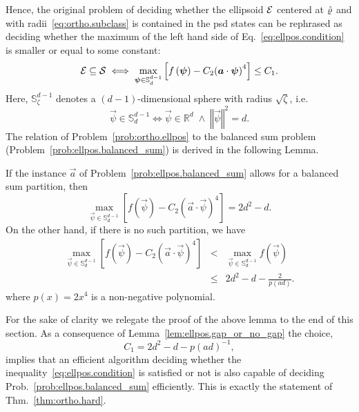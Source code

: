 Hence, the original problem of deciding whether the ellipsoid $\mathcal{E}$ centered at $\hat{\varrho}$ and with radii~\eqref{eq:ortho.subclass} is contained in the psd states can be rephrased as deciding whether the maximum of the left hand side of Eq.~\eqref{eq:ellpos.condition} is smaller or equal to some constant:
\begin{equation}
  \mathcal{E}\subseteq\mathcal{S}
  \iff
  \max_{{\boldsymbol{\psi}}\in\mathbb{S}^{d-1}_{d}}\left[f\left({\boldsymbol{\psi}}\right)-C_{2}{\left({\boldsymbol{a}} \cdot {\boldsymbol{\psi}}\right)}^{4}\right]\leq C_{1}.
  \label{eq:ellpos.max_condition}
\end{equation}
Here, $ \mathbb{S}^{d-1}_{\zeta}$ denotes a $(d-1)$-dimensional sphere with radius $\sqrt\zeta$, i.e.
\begin{equation}
 \vec\psi\in\mathbb{S}^{d-1}_{d} \iff    \vec\psi\in\mathbb{R}^{d}\;\wedge \; \left\Vert \vec\psi\right\Vert^{2}=d.
\end{equation}
The relation of Problem~\ref{prob:ortho.ellpos} to the balanced sum problem (Problem~\ref{prob:ellpos.balanced_sum}) is derived in the following Lemma.
\begin{lemma}\label{lem:ellpos.gap_or_no_gap}
  If the instance $\vec a$ of Problem~\ref{prob:ellpos.balanced_sum} allows for a balanced sum partition, then
  \begin{equation}
    \max_{\vec\psi\in\mathbb{S}^{d-1}_{d}}\left[f\left(\vec\psi\right)-C_{2}{\left( \vec a \cdot \vec\psi\right)}^{4}\right]
    = 2d^{2}-d \label{eq:ellpos.def_pi0}.
  \end{equation}
  On the other hand, if there is no such partition, we have
 \begin{align}
    \max_{\vec\psi\in\mathbb{S}^{d-1}_{d}}\left[f\left(\vec\psi\right)-C_{2}{\left( \vec a \cdot \vec\psi\right)}^{4}\right]
    &<&   \max_{\vec\psi\in\mathbb{S}^{d-1}_{d}}f\left(\vec\psi\right)\label{eq:ellpos.def_pi}\\
    &\leq&2d^{2}-d - \frac{2}{p(a d)}
    \label{eq:ellpos.def_pi2}.
  \end{align}
  where $p(x)=2 x^4$ is a non-negative polynomial.
\end{lemma}
For the sake of clarity we relegate the proof of the above lemma to the end of this section.
As a consequence of Lemma~\ref{lem:ellpos.gap_or_no_gap} the choice,
\begin{equation}
  C_{1}=2d^{2}-d-p{(a d)}^{-1},
  \label{eq:ellpos.choice}
\end{equation}
implies that an efficient algorithm deciding whether the inequality~\eqref{eq:ellpos.condition} is satisfied or not is also capable of deciding Prob.~\ref{prob:ellpos.balanced_sum} efficiently.
This is exactly the statement of Thm.~\ref{thm:ortho.hard}.\\


